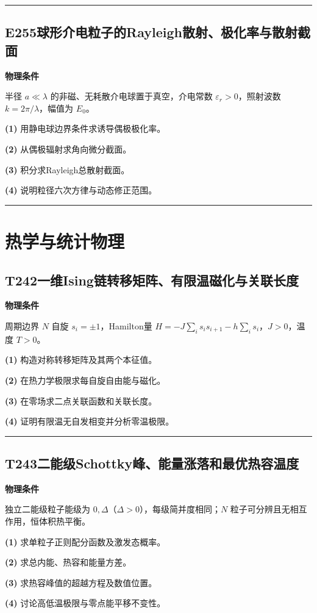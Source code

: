 \documentclass[UTF8,a4paper,11pt,oneside,openany]{ctexbook}
\begin{document}
\par\bigskip\hrule\bigskip
\section*{E255\quad 球形介电粒子的Rayleigh散射、极化率与散射截面}
\textbf{物理条件}\par 半径 \(a\ll\lambda\) 的非磁、无耗散介电球置于真空，介电常数 \(\varepsilon_r>0\)，照射波数 \(k=2\pi/\lambda\)，幅值为 \(E_0\)。
\par\noindent\textbf{(1)} 用静电球边界条件求诱导偶极极化率。
\par\noindent\textbf{(2)} 从偶极辐射求角向微分截面。
\par\noindent\textbf{(3)} 积分求Rayleigh总散射截面。
\par\noindent\textbf{(4)} 说明粒径六次方律与动态修正范围。

\par\bigskip\hrule\bigskip
\chapter{热学与统计物理}
\section*{T242\quad 一维Ising链转移矩阵、有限温磁化与关联长度}
\textbf{物理条件}\par 周期边界 \(N\) 自旋 \(s_i=\pm1\)，Hamilton量 \(H=-J\sum_i s_is_{i+1}-h\sum_i s_i\)，\(J>0\)，温度 \(T>0\)。
\par\noindent\textbf{(1)} 构造对称转移矩阵及其两个本征值。
\par\noindent\textbf{(2)} 在热力学极限求每自旋自由能与磁化。
\par\noindent\textbf{(3)} 在零场求二点关联函数和关联长度。
\par\noindent\textbf{(4)} 证明有限温无自发相变并分析零温极限。

\par\bigskip\hrule\bigskip
\section*{T243\quad 二能级Schottky峰、能量涨落和最优热容温度}
\textbf{物理条件}\par 独立二能级粒子能级为 \(0,\Delta\)（\(\Delta>0\)），每级简并度相同；\(N\) 粒子可分辨且无相互作用，恒体积热平衡。
\par\noindent\textbf{(1)} 求单粒子正则配分函数及激发态概率。
\par\noindent\textbf{(2)} 求总内能、热容和能量方差。
\par\noindent\textbf{(3)} 求热容峰值的超越方程及数值位置。
\par\noindent\textbf{(4)} 讨论高低温极限与零点能平移不变性。
\end{document}

